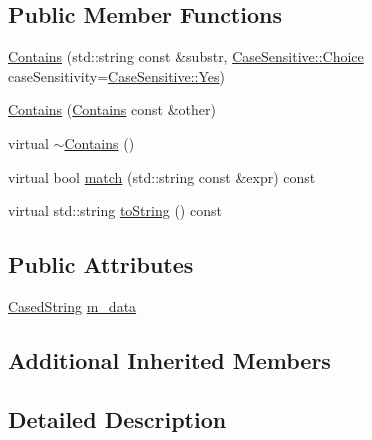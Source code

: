 \subsection*{Public Member Functions}
\begin{DoxyCompactItemize}
\item 
\hyperlink{struct_catch_1_1_matchers_1_1_impl_1_1_std_string_1_1_contains_a7a062d83bd3e3075929dbb55e1c24258}{Contains} (std\+::string const \&substr, \hyperlink{struct_catch_1_1_case_sensitive_aad49d3aee2d97066642fffa919685c6a}{Case\+Sensitive\+::\+Choice} case\+Sensitivity=\hyperlink{struct_catch_1_1_case_sensitive_aad49d3aee2d97066642fffa919685c6aa7c5550b69ec3c502e6f609b67f9613c6}{Case\+Sensitive\+::\+Yes})
\item 
\hyperlink{struct_catch_1_1_matchers_1_1_impl_1_1_std_string_1_1_contains_ad6b1ef653dfcb3bab43c43be043dc4e8}{Contains} (\hyperlink{struct_catch_1_1_matchers_1_1_impl_1_1_std_string_1_1_contains}{Contains} const \&other)
\item 
virtual \hyperlink{struct_catch_1_1_matchers_1_1_impl_1_1_std_string_1_1_contains_ae7a327dca00ff985b69b39bc883b7cb2}{$\sim$\+Contains} ()
\item 
virtual bool \hyperlink{struct_catch_1_1_matchers_1_1_impl_1_1_std_string_1_1_contains_a2248f3d0d1eb5cf5a1059c183b811a7c}{match} (std\+::string const \&expr) const
\item 
virtual std\+::string \hyperlink{struct_catch_1_1_matchers_1_1_impl_1_1_std_string_1_1_contains_aed168ddff5bce9295aec5c7daca89849}{to\+String} () const
\end{DoxyCompactItemize}
\subsection*{Public Attributes}
\begin{DoxyCompactItemize}
\item 
\hyperlink{struct_catch_1_1_matchers_1_1_impl_1_1_std_string_1_1_cased_string}{Cased\+String} \hyperlink{struct_catch_1_1_matchers_1_1_impl_1_1_std_string_1_1_contains_a419a9ecaeaa417d4987982402e08b3eb}{m\+\_\+data}
\end{DoxyCompactItemize}
\subsection*{Additional Inherited Members}


\subsection{Detailed Description}


